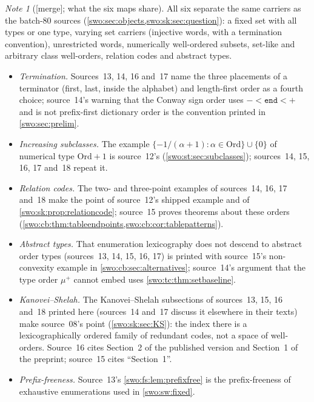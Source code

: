 \documentclass[11pt]{article}
\theoremstyle{definition}
\theoremstyle{remark}
\newtheorem{note}[note]{Note}
\newcommand{\Ord}{\mathrm{Ord}}
\newcommand{\End}{\mathtt{end}}
\newcommand{\merge}{\textsf{[merge]}}
\begin{document}
\begin{note}[\merge; what the six maps share]\label{swo:vii:note:maps}
All six separate the same carriers as the batch-80 sources
(\cref{swo:sec:objects,swo:sk:sec:question}): a fixed set with all types or
one type, varying set carriers (injective words, with a termination
convention), unrestricted words, numerically well-ordered subsets, set-like
and arbitrary class well-orders, relation codes and abstract types.
\begin{itemize}
\item \emph{Termination.} Sources~13, 14, 16 and~17 name the three placements
of a terminator (first, last, inside the alphabet) and length-first order as
a fourth choice; source~14's warning that the Conway sign order uses
$-<\End<+$ and is not prefix-first dictionary order is the convention printed in
\cref{swo:sec:prelim}.
\item \emph{Increasing subclasses.} The example
$\{-1/(\alpha+1):\alpha\in\Ord\}\cup\{0\}$ of numerical type $\Ord+1$ is
source~12's (\cref{swo:st:sec:subclasses}); sources~14, 15, 16, 17 and~18
repeat it.
\item \emph{Relation codes.} The two- and three-point examples of
sources~14, 16, 17 and~18 make the point of source~12's shipped example and
of \cref{swo:sk:prop:relationcode}; source~15 proves theorems about these
orders (\cref{swo:cb:thm:tableendpoints,swo:cb:cor:tablepatterns}).
\item \emph{Abstract types.} That enumeration lexicography does not descend to
abstract order types (sources~13, 14, 15, 16, 17) is printed with source~15's
non-convexity example in \cref{swo:cb:sec:alternatives}; source~14's argument
that the type order $\mu^+$ cannot embed uses \cref{swo:tc:thm:setbaseline}.
\item \emph{Kanovei--Shelah.} The Kanovei--Shelah subsections of sources~13, 15, 16 and~18
printed here (sources~14 and~17 discuss it elsewhere in their texts) make
source~08's point (\cref{swo:sk:sec:KS}): the index there is a
lexicographically ordered family of redundant codes, not a space of
well-orders. Source~16 cites Section~2 of the published version and Section~1
of the preprint; source~15 cites ``Section~1''.
\item \emph{Prefix-freeness.} Source~13's \cref{swo:fs:lem:prefixfree} is the
prefix-freeness of exhaustive enumerations used in \cref{swo:sw:fixed}.
\end{itemize}
\end{note}
\end{document}

